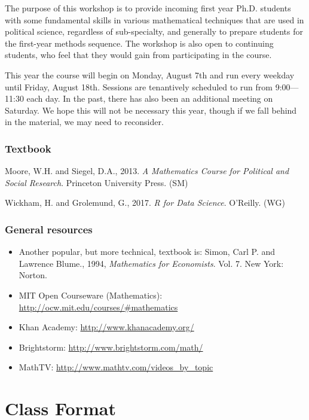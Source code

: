 \documentclass[12pt]{article}
\begin{document}
The purpose of this workshop is to provide incoming first year Ph.D. students
with some fundamental skills in various mathematical techniques that are used in
political science, regardless of sub-specialty, and generally to prepare
students for the first-year methods sequence. The workshop is also open to
continuing students, who feel that they would gain from participating in the
course.

This year the course will begin on Monday, August 7th and run every weekday
until Friday, August 18th. Sessions are tenantively scheduled to run from
9:00---11:30 each day. In the past, there has also been an additional meeting on
Saturday. We hope this will not be necessary this year, though if we fall behind
in the material, we may need to reconsider.


\subsubsection*{Textbook}

Moore, W.H. and Siegel, D.A., 2013.
\emph{A Mathematics Course for Political and Social Research}.
Princeton University Press. (SM)

Wickham, H. and Grolemund, G., 2017. \emph{R for Data Science}. O’Reilly. (WG)


\subsubsection*{General resources}

\begin{itemize}
\item Another popular, but more technical, textbook is: Simon, Carl P. and
  Lawrence Blume., 1994, \emph{Mathematics for Economists}. Vol. 7. New York:
  Norton.
\item MIT Open Courseware (Mathematics):
  \url{http://ocw.mit.edu/courses/#mathematics}
\item Khan Academy: \url{http://www.khanacademy.org/}
\item Brightstorm: \url{http://www.brightstorm.com/math/}
\item MathTV: \url{http://www.mathtv.com/videos\_by\_topic}
\end{itemize}


\section*{Class Format}
\end{document}
